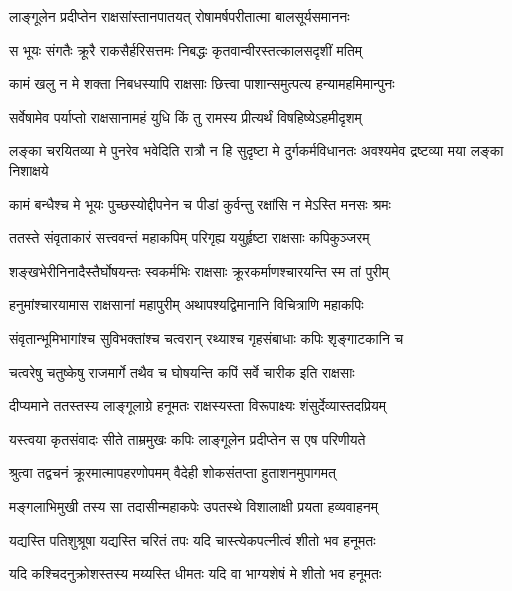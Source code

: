 \addtocounter{shlokacount}{1}

\twolineshloka
{लाङ्गूलेन प्रदीप्तेन राक्षसांस्तानपातयत्}
{रोषामर्षपरीतात्मा बालसूर्यसमाननः} %

\twolineshloka
{स भूयः संगतैः क्रूरै राकसैर्हरिसत्तमः}
{निबद्धः कृतवान्वीरस्तत्कालसदृशीं मतिम्} %

\twolineshloka
{कामं खलु न मे शक्ता निबधस्यापि राक्षसाः}
{छित्त्वा पाशान्समुत्पत्य हन्यामहमिमान्पुनः} %

\twolineshloka
{सर्वेषामेव पर्याप्तो राक्षसानामहं युधि}
{किं तु रामस्य प्रीत्यर्थं विषहिष्येऽहमीदृशम्} %

\threelineshloka
{लङ्का चरयितव्या मे पुनरेव भवेदिति}
{रात्रौ न हि सुदृष्टा मे दुर्गकर्मविधानतः}
{अवश्यमेव द्रष्टव्या मया लङ्का निशाक्षये} %

\twolineshloka
{कामं बन्धैश्च मे भूयः पुच्छस्योद्दीपनेन च}
{पीडां कुर्वन्तु रक्षांसि न मेऽस्ति मनसः श्रमः} %

\twolineshloka
{ततस्ते संवृताकारं सत्त्ववन्तं महाकपिम्}
{परिगृह्य ययुर्हृष्टा राक्षसाः कपिकुञ्जरम्} %

\twolineshloka
{शङ्खभेरीनिनादैस्तैर्घोषयन्तः स्वकर्मभिः}
{राक्षसाः क्रूरकर्माणश्चारयन्ति स्म तां पुरीम्} %

\twolineshloka
{हनुमांश्चारयामास राक्षसानां महापुरीम्}
{अथापश्यद्विमानानि विचित्राणि महाकपिः} %

\twolineshloka
{संवृतान्भूमिभागांश्च सुविभक्तांश्च चत्वरान्}
{रथ्याश्च गृहसंबाधाः कपिः शृङ्गाटकानि च} %

\twolineshloka
{चत्वरेषु चतुष्केषु राजमार्गे तथैव च}
{घोषयन्ति कपिं सर्वे चारीक इति राक्षसाः} %

\twolineshloka
{दीप्यमाने ततस्तस्य लाङ्गूलाग्रे हनूमतः}
{राक्षस्यस्ता विरूपाक्ष्यः शंसुर्देव्यास्तदप्रियम्} %

\twolineshloka
{यस्त्वया कृतसंवादः सीते ताम्रमुखः कपिः}
{लाङ्गूलेन प्रदीप्तेन स एष परिणीयते} %

\twolineshloka
{श्रुत्वा तद्वचनं क्रूरमात्मापहरणोपमम्}
{वैदेही शोकसंतप्ता हुताशनमुपागमत्} %

\twolineshloka
{मङ्गलाभिमुखी तस्य सा तदासीन्महाकपेः}
{उपतस्थे विशालाक्षी प्रयता हव्यवाहनम्} %

\twolineshloka
{यद्यस्ति पतिशुश्रूषा यद्यस्ति चरितं तपः}
{यदि चास्त्येकपत्नीत्वं शीतो भव हनूमतः} %

\twolineshloka
{यदि कश्चिदनुक्रोशस्तस्य मय्यस्ति धीमतः}
{यदि वा भाग्यशेषं मे शीतो भव हनूमतः} %

